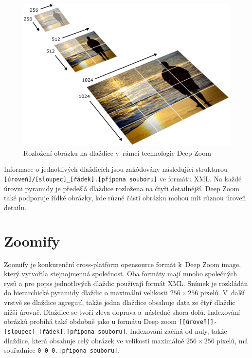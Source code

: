 \begin{figure}[htbp]
\centering
    \includegraphics[scale=.5]{obrazky-figures/formats/deepZoom1.png}
    \caption{Rozložení obrázku na dlaždice v~rámci technologie Deep Zoom\protect\footnotemark}
\end{figure}

\newpage
\noindent
Informace o jednotlivých dlaždicích jsou zakódovány následující strukturou \\\texttt{[úroveň]/[sloupec]\_[řádek].[přípona souboru]} ve formátu XML. Na každé úrovni pyramidy je předešlá dlaždice rozložena na čtyři detailnější. Deep Zoom také podporuje řídké obrázky, kde různé části obrázku mohou mít různou úroveň detailu.


\section{Zoomify}
Zoomify \cite{IntroductionZoomifyImage} je konkurenční cross-platform opensource formát k~Deep Zoom image, který vytvořila stejnojmenná společnost. Oba formáty mají mnoho společných rysů a pro popis jednotlivých dlaždic používají formát XML. Snímek je rozkládán do hierarchické pyramidy dlaždic o maximální velikosti $256\times256$ pixelů. V~další vrstvě se dlaždice agregují, takže jedna dlaždice obsahuje data ze čtyř dlaždic nižší úrovně. Dlaždice se tvoří zleva doprava a~následně shora dolů. Indexování obrázků probíhá také obdobně jako u formátu Deep zoom \texttt{[[úroveň]]-[sloupec]\_[řádek].[přípona souboru]}. Indexování začíná od nuly, takže dlaždice, která obsahuje celý obrázek ve velikosti maximálně $256\times256$ pixelů, má souřadnice \texttt{0-0-0.[přípona souboru]}.

